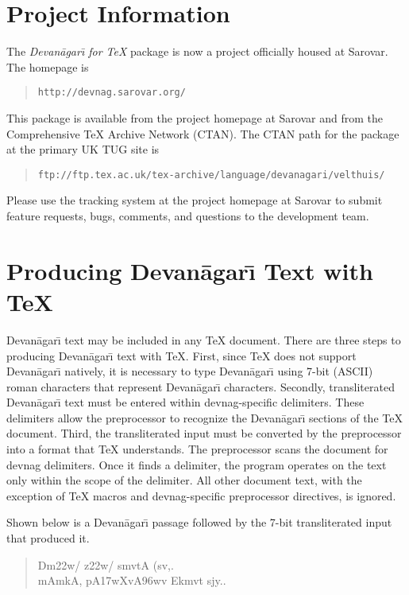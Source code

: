 \documentclass[10pt]{article}
\newcommand{\devnag}{Devan\=agar{\=\i}}
\begin{document}
\section{Project Information}

The \textit{\devnag{} for \TeX{}} package is now a project
officially housed at Sarovar. The homepage is

\begin{quote}
\texttt{http://devnag.sarovar.org/}
\end{quote}

This package is available from the project homepage at Sarovar and
from the Comprehensive \TeX{} Archive Network (CTAN). The CTAN path
for the package at the primary UK TUG site is

\begin{quote}
\texttt{ftp://ftp.tex.ac.uk/tex-archive/language/devanagari/velthuis/}
\end{quote}

Please use the tracking system at the project homepage at Sarovar to
submit feature requests, bugs, comments, and questions to the development
team.


\section{Producing \devnag{} Text with \TeX{}}

\devnag{} text may be included in any \TeX{} document. There are three steps
to producing \devnag{} text with \TeX{}. First, since \TeX{} does
not support \devnag{} natively, it is necessary to type \devnag{} using
\hbox{7-bit} (ASCII) roman characters that represent \devnag{} characters.
Secondly, transliterated \devnag{} text must be entered within
\textsf{devnag}-specific delimiters. These delimiters allow the preprocessor
to recognize the \devnag{} sections of the \TeX{} document. Third, the
transliterated input must be converted by the preprocessor into a format
that \TeX{} understands. The preprocessor scans the document for
\textsf{devnag} delimiters. Once it finds a delimiter, the program operates
on the text only within the scope of the delimiter. All other document text,
with the exception of \TeX{} macros and \textsf{devnag}-specific preprocessor
directives, is ignored.

Shown below is a \devnag{} passage followed by the 7-bit transliterated
input that produced it.

\begin{quote}
{\dn Dm\0\322w\?/\? z\322w\?/\? smv\?tA (sv,.\\
mAmkA, pA\317wXvA\396w\4v Ekmv\0t s\2jy..\par}
\end{quote}
\end{document}
